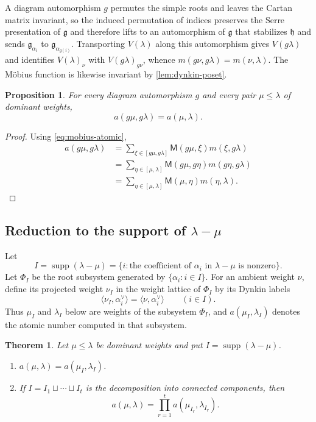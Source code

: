 \documentclass[11pt]{article}
\newtheorem{theorem}{Theorem}[section]
\newtheorem{proposition}[proposition]{Proposition}
\theoremstyle{definition}
\theoremstyle{remark}
\newcommand{\Raiz}{\Phi}
\newcommand{\supp}{\operatorname{supp}}
\newcommand{\Mu}{\mathsf{M}}
\begin{document}
A diagram automorphism $g$ permutes the simple roots and leaves the Cartan
matrix invariant, so the induced permutation of indices preserves the Serre
presentation of $\mathfrak g$ and therefore lifts to an automorphism of
$\mathfrak g$ that stabilizes $\mathfrak h$ and sends $\mathfrak g_{\alpha_i}$
to $\mathfrak g_{\alpha_{g(i)}}$.  Transporting $V(\lambda)$ along this
automorphism gives $V(g\lambda)$ and identifies $V(\lambda)_\nu$ with
$V(g\lambda)_{g\nu}$, whence $m(g\nu,g\lambda)=m(\nu,\lambda)$.  The M\"obius
function is likewise invariant by \cref{lem:dynkin-poset}.

\begin{proposition}\label{prop:atomic-dynkin}
For every diagram automorphism $g$ and every pair $\mu\le\lambda$ of dominant
weights,
\[
     a(g\mu,g\lambda)=a(\mu,\lambda).
\]
\end{proposition}

\begin{proof}
Using \eqref{eq:mobius-atomic},
\begin{align*}
 a(g\mu,g\lambda)
  &=\sum_{\xi\in[g\mu,g\lambda]}
       \Mu(g\mu,\xi)m(\xi,g\lambda)\\
  &=\sum_{\eta\in[\mu,\lambda]}
       \Mu(g\mu,g\eta)m(g\eta,g\lambda)\\
  &=\sum_{\eta\in[\mu,\lambda]}
       \Mu(\mu,\eta)m(\eta,\lambda).
\end{align*}
\end{proof}

\subsection{Reduction to the support of $\lambda-\mu$}

Let
\[
     I=\supp(\lambda-\mu)
       =\{i:\text{the coefficient of }\alpha_i
                    \text{ in }\lambda-\mu\text{ is nonzero}\}.
\]
Let $\Raiz_I$ be the root subsystem generated by $\{\alpha_i:i\in I\}$.
For an ambient weight $\nu$, define its projected weight $\nu_I$ in the
weight lattice of $\Raiz_I$ by its Dynkin labels
\begin{equation}\label{eq:support-projection}
 \langle\nu_I,\alpha_i^\vee\rangle
   =\langle\nu,\alpha_i^\vee\rangle
 \qquad(i\in I).
\end{equation}
Thus $\mu_I$ and $\lambda_I$ below are weights of the subsystem
$\Raiz_I$, and $a(\mu_I,\lambda_I)$ denotes the atomic number computed in
that subsystem.

\begin{theorem}\label{thm:support-reduction}
Let $\mu\le\lambda$ be dominant weights and put
$I=\supp(\lambda-\mu)$.
\begin{enumerate}[label=\textnormal{(\roman*)}]
\item \label{item:support-one}
      $a(\mu,\lambda)=a(\mu_I,\lambda_I)$.
\item \label{item:support-product}
      If $I=I_1\sqcup\cdots\sqcup I_t$ is the decomposition into connected
      components, then
      \[
          a(\mu,\lambda)
            =\prod_{r=1}^t a(\mu_{I_r},\lambda_{I_r}).
      \]
\end{enumerate}
\end{theorem}
\end{document}
